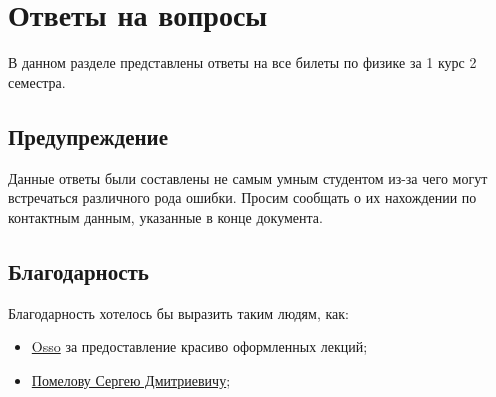 \documentclass{extarticle}
\begin{document}
	

	\tableofcontents
	\newpage
	\section{Ответы на вопросы}
	В данном разделе представлены ответы на все билеты по физике за 1 курс 2 семестра.

	\subsection*{Предупреждение}
	Данные ответы были составлены не самым умным студентом из-за чего могут встречаться различного рода ошибки. Просим сообщать о их нахождении по контактным данным, указанные в конце документа.

	\subsection*{Благодарность}
	Благодарность хотелось бы выразить таким людям, как:
	\begin{itemize}
		\item \href{https://t.me/o_s_so}{Osso} за предоставление красиво оформленных лекций;
		\item \href{https://t.me/ka_vo}{Помелову Сергею Дмитриевичу};
	\end{itemize}

	\nopagebreak
	
	
	
	
	
	
	
	
	
	
	
	
	
	
	
	
	
	
	
	
	
	
	
	
	
	
	
	
	
	
	
	
	
	
	
	
	
\end{document}
